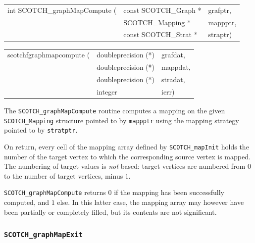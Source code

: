 \begin{itemize}
\progsyn

{\tt\begin{tabular}{l@{}ll}
int SCOTCH\_graphMapCompute ( & const SCOTCH\_Graph * & grafptr, \\
                              & SCOTCH\_Mapping *     & mappptr, \\
                              & const SCOTCH\_Strat * & straptr)
\end{tabular}}

{\tt\begin{tabular}{l@{}ll}
scotchfgraphmapcompute ( & doubleprecision (*) & grafdat, \\
                         & doubleprecision (*) & mappdat, \\
                         & doubleprecision (*) & stradat, \\
                         & integer             & ierr)
\end{tabular}}

\progdes

The {\tt SCOTCH\_graphMapCompute} routine computes a mapping
on the given {\tt SCOTCH\_\lbt Mapping} structure pointed
to by {\tt mappptr} using the mapping strategy pointed to
by {\tt stratptr}.

On return, every cell of the mapping array defined by
{\tt SCOTCH\_\lbt map\lbt Init} holds the number of the target
vertex to which the corresponding source vertex is mapped. The
numbering of target values is {\em not\/} based: target vertices are
numbered from $0$ to the number of target vertices, minus $1$.

\progret

{\tt SCOTCH\_graphMapCompute} returns $0$ if the mapping has been
successfully computed, and $1$ else. In this latter case, the mapping
array may however have been partially or completely filled, but its
contents are not significant.
\end{itemize}

\subsubsection{{\tt SCOTCH\_graphMapExit}}

